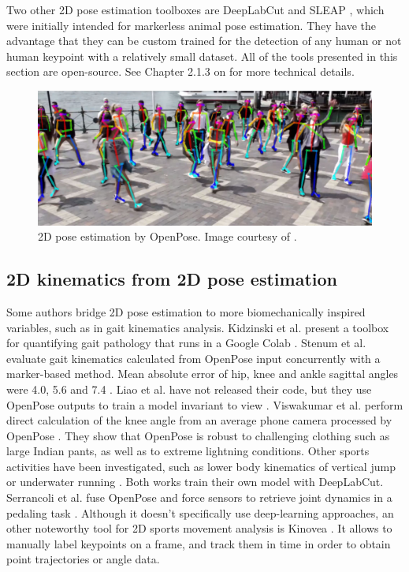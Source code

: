 Two other 2D pose estimation toolboxes are DeepLabCut \cite{Mathis2018} and SLEAP \cite{Pereira2022}, which were initially intended for markerless animal pose estimation. They have the advantage that they can be custom trained for the detection of any human or not human keypoint with a relatively small dataset. All of the tools presented in this section are open-source. See Chapter 2.1.3 on  for more technical details.

\begin{figure}[hbtp]
	\centering
	\def\svgwidth{1\columnwidth}
	\fontsize{10pt}{10pt}\selectfont
	\includegraphics[width=\linewidth]{"../Chap1/Figures/OpenPose.JPG"}
	\caption{2D pose estimation by OpenPose. Image courtesy of \cite{Cao2019}.}
	\label{fig_openpose}
\end{figure}

\subsection{2D kinematics from 2D pose estimation}

Some authors bridge 2D pose estimation to more biomechanically inspired variables, such as in gait kinematics analysis. Kidzinski et al. present a toolbox for quantifying gait pathology that runs in a Google Colab \cite{Kidziński2020}. Stenum et al. evaluate gait kinematics calculated from OpenPose input concurrently with a marker-based method. Mean absolute error of hip, knee and ankle sagittal angles were 4.0\degree{}, 5.6\degree{} and 7.4\degree{} \cite{Stenum2021}. Liao et al. have not released their code, but they use OpenPose outputs to train a model invariant to view \cite{Liao2020}. Viswakumar et al. perform direct calculation of the knee angle from an average phone camera processed by OpenPose \cite{Viswakumar2019}. They show that OpenPose is robust to challenging clothing such as large Indian pants, as well as to extreme lightning conditions. Other sports activities have been investigated, such as lower body kinematics of vertical jump \cite{Drazan2021} or underwater running \cite{Cronin2019}. Both works train their own model with DeepLabCut. Serrancoli et al. fuse OpenPose and force sensors to retrieve joint dynamics in a pedaling task \cite{Serrancolí2020}. Although it doesn't specifically use deep-learning approaches, an other noteworthy tool for 2D sports movement analysis is Kinovea \cite{Fernandez2020}. It allows to manually label keypoints on a frame, and track them in time in order to obtain point trajectories or angle data. 


